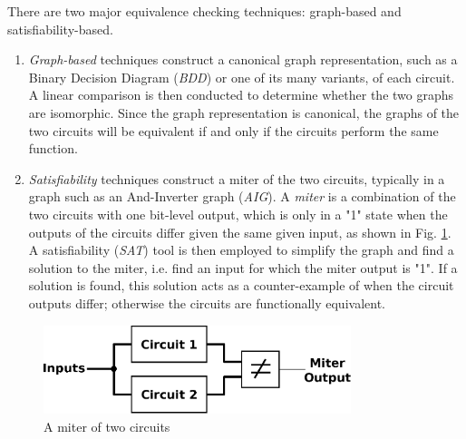 There are two major
equivalence checking techniques: graph-based
and satisfiability-based.
\begin{enumerate}
\item \emph{Graph-based} techniques construct a canonical graph 
representation, such as a Binary Decision Diagram (\emph{BDD}) or one of
its many variants, of each circuit. A linear comparison is then conducted to 
determine whether the two graphs are isomorphic. Since the graph 
representation is canonical, the graphs of the two circuits will be 
equivalent if and only if the circuits perform the same function.
\item \emph{Satisfiability} techniques construct a miter of the two circuits,
typically in a graph such as an And-Inverter graph (\emph{AIG}). A
\emph{miter} is a combination of the two circuits with one bit-level output, which 
is only in a "1" state when the outputs of the circuits differ given 
the same given 
input, as shown in Fig. \ref{fig:miter}. 
A satisfiability (\emph{SAT}) tool \cite{csat} 
is then employed to simplify the graph and find a solution to the miter, 
i.e. find an input for which the 
miter output is "1". If a solution is found, this solution acts as a 
counter-example of when the circuit outputs differ; otherwise the circuits
are functionally equivalent.
\end{enumerate}


{
\begin{figure}[h]
\centerline{
\includegraphics[width=0.8\textwidth]{./figures/betterMiter}
}
\caption{A miter of two circuits}
\label{fig:miter}
\end{figure}
}

